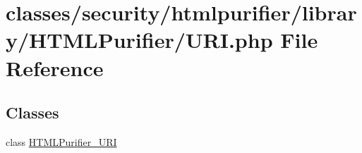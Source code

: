 \hypertarget{URI_8php}{\section{classes/security/htmlpurifier/library/\+H\+T\+M\+L\+Purifier/\+U\+R\+I.php File Reference}
\label{URI_8php}
}
\subsection*{Classes}
\begin{DoxyCompactItemize}
\item 
class \hyperlink{classHTMLPurifier__URI}{H\+T\+M\+L\+Purifier\+\_\+\+U\+R\+I}
\end{DoxyCompactItemize}
